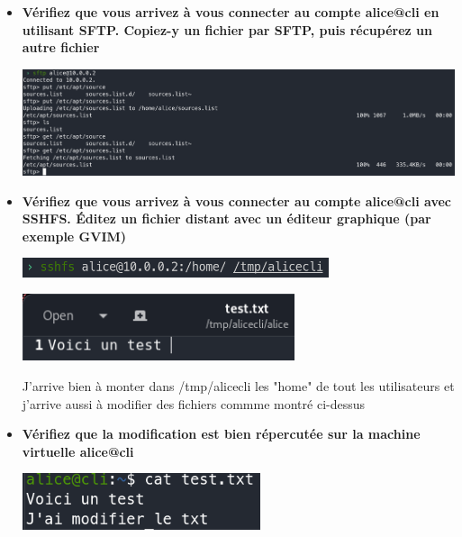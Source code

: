 \documentclass[12pt]{article}
\begin{document}
\begin{itemize}
  \item \textbf{Vérifiez que vous arrivez à vous connecter au compte alice@cli en utilisant SFTP.
  Copiez-y un fichier par SFTP, puis récupérez un autre fichier}
  \vspace{0.3cm}

  \includegraphics[width=15cm]{images/screen-ssh-td3-4.png}
\end{itemize}
\vspace{0.6cm}

\begin{itemize}
  \item \textbf{Vérifiez que vous arrivez à vous connecter au compte alice@cli avec SSHFS. Éditez un fichier distant
  avec un éditeur graphique (par exemple GVIM)}
  \vspace{0.3cm}

  \includegraphics[width=9cm]{images/screen-ssh-td3-5.png}
  \vspace{0.3cm}

  \includegraphics[width=8cm]{images/screen-ssh-td3-6.png}
  \vspace{0.3cm}

  J'arrive bien à monter dans /tmp/alicecli les "home" de tout les utilisateurs et j'arrive aussi à modifier des fichiers
  commme montré ci-dessus

\end{itemize}
\vspace{0.3cm}

\begin{itemize}
  \item \textbf{Vérifiez que la modification est bien répercutée sur la machine virtuelle alice@cli}
  \vspace{0.3cm}

  \includegraphics[width=7cm]{images/screen-ssh-td3-7.png}

\end{itemize}
\vspace{0.3cm}
\end{document}
